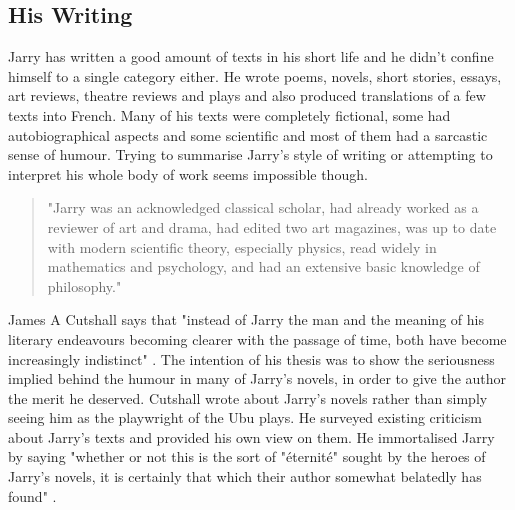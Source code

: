 \subsection{His Writing}

Jarry has written a good amount of texts in his short life and he didn't confine himself to a single category either. He wrote poems, novels, short stories, essays, art reviews, theatre reviews and plays and also produced translations of a few texts into French. Many of his texts were completely fictional, some had autobiographical aspects and some scientific and most of them had a sarcastic sense of humour. Trying to summarise Jarry's style of writing or attempting to interpret his whole body of work seems impossible though.

\begin{quote}
  "Jarry was an acknowledged classical scholar, had already worked as a reviewer of art and drama, had edited two art magazines, was up to date with modern scientific theory, especially physics, read widely in mathematics and psychology, and had an extensive basic knowledge of philosophy." \citep{Brotchie2011}
\end{quote}

James A Cutshall says that "instead of Jarry the man and the meaning of his literary endeavours becoming clearer with the passage of time, both have become increasingly indistinct" \citep[p.246]{Cutshall1988}. The intention of his thesis was to show the seriousness implied behind the humour in many of Jarry's novels, in order to give the author the merit he deserved. Cutshall wrote about Jarry's novels rather than simply seeing him as the playwright of the Ubu plays. He surveyed existing criticism about Jarry's texts and provided his own view on them. He immortalised Jarry by saying "whether or not this is the sort of "éternité" sought by the heroes of Jarry's novels, it is certainly that which their author somewhat belatedly has found" \citep[p.248]{Cutshall1988}.

